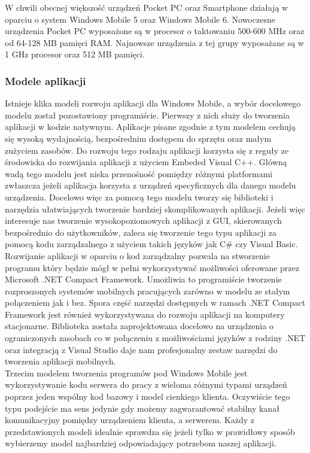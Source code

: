 W chwili obecnej większość urządzeń Pocket PC oraz Smartphone działają w oparciu
o system Windows Mobile 5 oraz Windows Mobile 6. Nowoczesne urządzenia Pocket PC
wyposażone są w procesor o taktowaniu 500-600 MHz oraz od 64-128 MB pamięci RAM.
Najnowsze urządzenia z tej grupy wyposażane są w 1 GHz procesor oraz 512 MB
pamięci.
\subsubsection{Modele aplikacji}
Istnieje klika modeli rozwoju aplikacji dla Windows Mobile, a wybór docelowego
modelu został pozostawiony programiście. Pierwszy z nich służy do tworzenia
aplikacji w kodzie natywnym. Aplikacje pisane zgodnie z tym modelem cechują się
wysoką wydajnością, bezpośrednim dostępem do sprzętu oraz małym zużyciem
zasobów. Do rozwoju tego rodzaju aplikacji korzysta się z reguły ze środowiska do
rozwijania aplikacji z użyciem Embeded Visual C++. Główną wadą tego modelu jest
niska przenośność pomiędzy różnymi platformami zwłaszcza jeżeli aplikacja
korzysta z urządzeń specyficznych dla danego modelu urządzenia. Docelowo więc za
pomocą tego modelu tworzy się biblioteki i narzędzia ułatwiających tworzenie
bardziej skomplikowanych aplikacji. Jeżeli więc interesuje nas tworzenie
wysokopoziomowych aplikacji z GUI, skierowanych bezpośrednio do użytkowników,
zaleca się tworzenie tego typu aplikacji za pomocą kodu zarządzalnego z użyciem
takich języków jak C\# czy Visual Basic. Rozwijanie aplikacji w oparciu o kod
zarządzalny pozwala na stworzenie programu który będzie mógł w pełni
wykorzystywać możliwości oferowane przez Microsoft .NET Compact Framework.
Umożliwia to programiście tworzenie rozproszonych systemów mobilnych pracujących
zarówno w modelu ze stałym połączeniem jak i bez. Spora część narzędzi
dostępnych w ramach .NET Compact Framework jest również wykorzystywana do rozwoju
aplikacji na komputery stacjonarne. Biblioteka została zaprojektowana docelowo na
urządzenia o ograniczonych zasobach co w połączeniu z możliwościami języków z
rodziny .NET oraz integracją z Visual Studio daje nam profesjonalny zestaw
narzędzi do tworzenia aplikacji mobilnych.
\\
Trzecim modelem tworzenia programów pod Windows Mobile jest wykorzystywanie kodu
serwera do pracy z wieloma różnymi typami urządzeń poprzez jeden wspólny kod
bazowy i model cienkiego klienta. Oczywiście tego typu podejście ma sens jedynie
gdy możemy zagwarantować stabilny kanał komunikacyjny pomiędzy urządzeniem
klienta, a serwerem. Każdy z przedstawionych modeli idealnie sprawdza się jeżeli
tylko w prawidłowy sposób wybierzemy model najbardziej odpowiadający potrzebom
naszej aplikacji.

